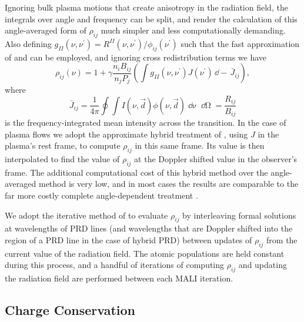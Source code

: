 Ignoring bulk plasma motions that create anisotropy in the radiation field, the integrals over angle and frequency can be split, and render the calculation of this angle-averaged form of $\rho_{ij}$ much simpler and less computationally demanding.
Also defining $g_{II}(\nu, \nu^\prime) = R^{II}(\nu, \nu^\prime)/\phi_{ij}(\nu^\prime)$ such that the fast approximation of \citet{Gouttebroze1986} and \citet{Uitenbroek1989} can be employed, and ignoring cross redistribution terms we have
\begin{equation}
    \label{Eq:RhoPrdAa}
    \rho_{ij}(\nu) = 1 + \gamma \frac{n_i B_{ij}}{n_j P_j} \left( \int g_{II}(\nu, \nu^\prime) J(\nu^\prime) \mathop{\dd{}\nu^\prime} -\,\bar{J}_{ij} \right),
\end{equation}
where
\begin{equation}
\bar{J}_{ij} = \frac{1}{4\pi} \oint \int I(\nu, \vec{d}) \phi(\nu, \vec{d}) \mathop{\dd{}\nu}\mathop{\dd{}\Omega} = \frac{R_{ij}}{B_{ij}}
\end{equation}
is the frequency-integrated mean intensity across the transition.
In the case of plasma flows we adopt the approximate hybrid treatment of \citet{Leenaarts2012}, using $J$ in the plasma's rest frame, to compute $\rho_{ij}$ in this same frame.
Its value is then interpolated to find the value of $\rho_{ij}$ at the Doppler shifted value in the observer's frame.
The additional computational cost of this hybrid method over the angle-averaged method is very low, and in most cases the results are comparable to the far more costly complete angle-dependent treatment \citep{Leenaarts2012, Kerr2019}.

We adopt the iterative method of \citet{Uitenbroek2001} to evaluate $\rho_{ij}$ by interleaving formal solutions at wavelengths of PRD lines (and wavelengths that are Doppler shifted into the region of a PRD line in the case of hybrid PRD) between updates of $\rho_{ij}$ from the current value of the radiation field.
The atomic populations are held constant during this process, and a handful of iterations of computing $\rho_{ij}$ and updating the radiation field are performed between each MALI iteration.


\subsection{Charge Conservation}\label{Sec:ChargeCons}

